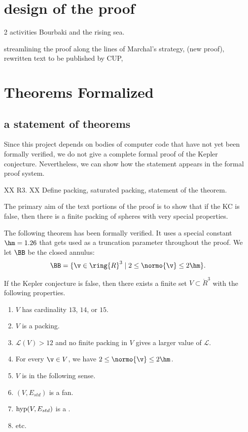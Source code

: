 \documentclass{llncs}
\def\op#1{{\hbox{#1}}}
\begin{document}
\section{design of the proof}

2 activities Bourbaki and the rising sea.

streamlining the proof along the lines of Marchal's strategy, (new proof), 
rewritten text to be published by CUP,



\section{Theorems Formalized}



\subsection{a statement of theorems}

Since this project depends on bodies of computer code that have not
yet been formally verified, we do not give a complete formal proof
of the Kepler conjecture.  Nevertheless, we can show how the statement
appears in the formal proof system.

XX R3.
XX Define packing, saturated packing, statement of the theorem.

The primary aim of the text portions of the proof is to show that if the KC is
false, then there is a finite packing of spheres with very special properties.

The following theorem has been formally verified.  It uses a special constant
$\hm=1.26$ that gets used as a truncation parameter throughout the proof.
We let $\BB$ be the closed annulus:
\[
\BB = \{\v\in\ring{R}^3 \mid 2\le \normo{\v}\le 2\hm\}.
\]

\begin{theorem}
If the Kepler conjecture is false, then there exists a finite set $V\subset\ring{R}^3$
with the following properties.
\begin{enumerate}
\item $V$ has cardinality $13$, $14$, or $15$.
\item $V$ is a packing.
\item ${\mathcal L}(V) > 12$ and no finite packing in $V$ gives a
  larger value of ${\mathcal L}$.
\item For every $\v\in V$, we have $2\le \normo{\v}\le 2\hm$.
\item $V$ is  in the following sense.
\item $(V,E_{std})$ is a fan.
\item $\op{hyp}(V,E_{std})$ is a .
\item etc.
\end{enumerate}
\end{theorem}
\end{document}

